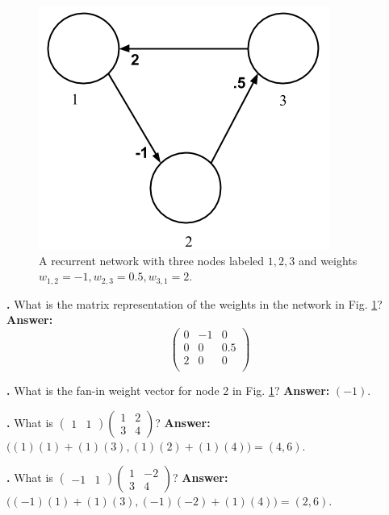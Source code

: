 \begin{figure}[h]
\centering
\includegraphics[scale=0.45]{./images/3NodeNet.png}
\caption[Jeff Yoshimi.]{A recurrent network with three nodes labeled $1,2,3$ and weights $w_{1,2} = -1, w_{2,3}=0.5, w_{3,1}=2$.}
\label{sampleNetRecurrent}
\end{figure}

\noindent
{}
{\bf \theLinearAlgebraCounter.}  What is the matrix representation of the weights in the network in Fig. \ref{sampleNetRecurrent}?
{\bf Answer:}  
\[
\begin{pmatrix}
 0  &   -1 & 0 \\
 0  &   0 & 0.5 \\
 2  &   0 & 0 \\
\end{pmatrix}
\]
\bigskip

\noindent
{}
{\bf \theLinearAlgebraCounter.}  What is the fan-in weight vector for node 2 in Fig. \ref{sampleNetRecurrent}?
{\bf Answer:}  $(-1)$. 
\bigskip

\noindent
{}
{\bf \theLinearAlgebraCounter.}  What is
$\begin{pmatrix}1 & 1\end{pmatrix}\begin{pmatrix} 1 & 2  \\ 3 & 4 \end{pmatrix}$?
{\bf Answer:}  $\Big((1)(1) + (1)(3), (1)(2) + (1)(4)\Big)  = (4,6)$. 
\bigskip

\noindent
{}
{\bf \theLinearAlgebraCounter.}  What is
$\begin{pmatrix}-1 & 1\end{pmatrix}\begin{pmatrix} 1 & -2  \\ 3 & 4 \end{pmatrix}$?
{\bf Answer:}  $\Big((-1)(1) + (1)(3), (-1)(-2) + (1)(4)\Big)  = (2,6)$. 
\bigskip

